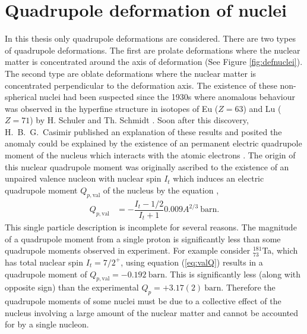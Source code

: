 \documentclass[10pt,a4paper, twoside, openright]{report}
\begin{document}
\section{Quadrupole deformation of nuclei} 
In this thesis only quadrupole deformations are considered. There are two types of quadrupole deformations. The first are prolate deformations where the nuclear matter is concentrated around the axis of deformation (See Figure \ref{fig:defnuclei}). The second type are oblate deformations where the nuclear matter is concentrated perpendicular to the deformation axis. The existence of these non-spherical nuclei had been suspected since the 1930s where anomalous behaviour was observed in the hyperfine structure in isotopes of Eu ($Z=63$) and Lu ($Z=71$) by H. Schuler and Th. Schmidt \cite{Schuler1935(1), Schuler1935(2)}. Soon after this discovery, H.~B.~G.~Casimir published an explanation of these results and posited the anomaly could be explained by the existence of an permanent electric quadrupole moment of the nucleus which interacts with the atomic electrons \cite{Casimir1935, Casimir1936}. The origin of this nuclear quadrupole moment was originally ascribed to the existence of an unpaired valence nucleon with nuclear spin $I_t$ which induces an electric quadrupole moment  $Q_{p,\text{val}}$ of the nucleus by the equation \cite{BohrMottVol1},
\begin{align}\label{eq:valQ}
Q_{p,\text{val}} &=  - \dfrac{I_t-1/2}{I_t + 1}0.009A^{2/3} \ \text{barn}.
\end{align}  
This single particle description is incomplete for several reasons. The magnitude of a quadrupole moment from a single proton is significantly less than some quadrupole moments observed in experiment. For example consider $^{181}_{73}$Ta, which has total nuclear spin $I_t=7/2^{+}$, using equation (\ref{eq:valQ}) results in a quadrupole moment of $Q_{p,\text{val}} = -0.192 \ \text{barn}$. This is significantly less (along with opposite sign) than the experimental $Q_p = +3.17(2) \ \text{barn}$. Therefore the quadrupole moments of some nuclei must be due to a collective effect of the nucleus involving a large amount of the nuclear matter and cannot be accounted for by a single nucleon.\\
\linebreak
\end{document}
